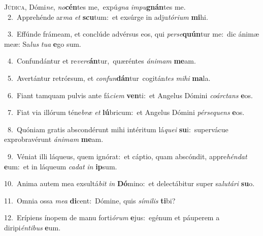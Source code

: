\lettrine{\initial\textcolor{\initialcolor}{J}}{údica,} Dómi\-\textit{ne}\-, \textit{no}\-\textbf{cén}tes me,~\star expú\textit{gna} \textit{im}\-\textit{pu}\textbf{gnán}tes me.\\
{\numbfont\textcolor{\numbcolor}{~2.}}~Apprehénde ar\textit{ma} \textit{et} \textbf{scu}\-tum:~\star et exsúrge in adju\-\textit{tó}\-\textit{ri}\textit{um} \textbf{mi}\-hi.\par
{\numbfont\textcolor{\numbcolor}{~3.}}~Effúnde frámeam, et conclúde advérsus eos, qui \textit{per}\-\textit{se}\textbf{quún}tur me:~\star dic ánimæ meæ: Sa\textit{lus} \textit{tu}\-\textit{a} \textbf{e}\-go sum.\par
{\numbfont\textcolor{\numbcolor}{~4.}}~Confundántur et re\-\textit{ve}\-\textit{re}\textbf{án}tur,~\star quæréntes \textit{á}\-\textit{ni}\textit{mam} \textbf{me}\-am.\par
{\numbfont\textcolor{\numbcolor}{~5.}}~Avertántur retrórsum, et \textit{con}\-\textit{fun}\textbf{dán}tur~\star cogitán\textit{tes} \textit{mi}\-\textit{hi} \textbf{ma}\-la.\par
{\numbfont\textcolor{\numbcolor}{~6.}}~Fiant tamquam pulvis ante fá\-\textit{ci}\-\textit{em} \textbf{ven}\-ti:~\star et Angelus Dómini \textit{co}\-\textit{árc}\textit{tans} \textbf{e}\-os.\par
{\numbfont\textcolor{\numbcolor}{~7.}}~Fiat via illórum téne\textit{bræ} \textit{et} \textbf{lú}\-bricum:~\star et Angelus Dómini \textit{pér}\-\textit{se}\textit{quens} \textbf{e}\-os.\par
{\numbfont\textcolor{\numbcolor}{~8.}}~Quóniam gratis abscondérunt mihi intéritum lá\-\textit{que}\-\textit{i} \textbf{su}\-i:~\star supervácue exprobravérunt \textit{á}\-\textit{ni}\textit{mam} \textbf{me}\-am.\par
{\numbfont\textcolor{\numbcolor}{~9.}}~Véniat illi láqueus, quem ignórat:~\dagger et cáptio, quam abscóndit, appre\-\textit{hén}\-\textit{dat} \textbf{e}\-um:~\star et in láqueum \textit{ca}\-\textit{dat} \textit{in} \textbf{ip}\-sum.\par
{\numbfont\textcolor{\numbcolor}{10.}}~Anima autem mea exsultá\textit{bit} \textit{in} \textbf{Dó}\-mino:~\star et delectábitur super sa\-\textit{lu}\-\textit{tá}\textit{ri} \textbf{su}\-o.\par
{\numbfont\textcolor{\numbcolor}{11.}}~Omnia ossa \textit{me}\-\textit{a} \textbf{di}\-cent:~\star Dómine, quis \textit{sí}\-\textit{mi}\textit{lis} \textbf{ti}\-bi?\par
{\numbfont\textcolor{\numbcolor}{12.}}~Erípiens ínopem de manu forti\-\textit{ó}\-\textit{rum} \textbf{e}\-jus:~\star egénum et páuperem a diripi\-\textit{én}\-\textit{ti}\textit{bus} \textbf{e}\-um.\par
